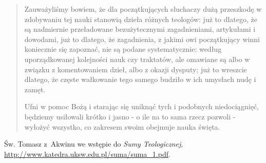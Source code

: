 \documentclass[a4paper,11pt]{article}
\begin{document}
\vspace{1em}


\begin{quote}

  Zauważyliśmy bowiem, że dla początkujących słuchaczy dużą przeszkodę
  w zdobywaniu tej nauki stanowią dzieła różnych teologów: już to
  dlatego, że są nadmiernie przeładowane bezużytecznymi zagadnieniami,
  artykułami i dowodami, już to dlatego, że zagadnienia, z jakimi owi
  początkujący winni koniecznie się zapoznać, nie są podane
  systematycznie: według uporządkowanej kolejności nauk czy traktatów,
  ale omawiane są albo w związku z komentowaniem dzieł, albo z okazji
  dysputy; już to wreszcie dlatego, że częste wałkowanie tego samego
  budziło w ich umysłach nudę i zamęt.

  Ufni w pomoc Bożą i starając się uniknąć tych i podobnych
  niedociągnięć, będziemy usiłowali krótko i jasno - o ile na to sama
  rzecz pozwoli - wyłożyć wszystko, co zakresem swoim obejmuje nauka
  święta.

\end{quote}

Św. Tomasz z~Akwinu we wstępie do \textit{Sumy Teologicznej},
\url{http://www.katedra.uksw.edu.pl/suma/suma_1.pdf}.












{}






\end{document}
